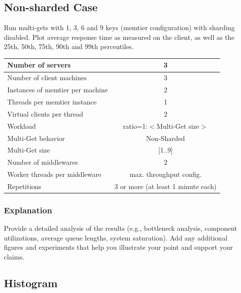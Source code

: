 \documentclass[11pt,a4paper]{article}
\begin{document}
\subsection{Non-sharded Case}

Run multi-gets with 1, 3, 6 and 9 keys (memtier configuration) with sharding disabled. Plot average response time as measured on the client, as well as the 25th, 50th, 75th, 90th and 99th percentiles.

\begin{center}
	\scriptsize{
		\begin{tabular}{|l|c|}
			\hline Number of servers                & 3                       \\ 
			\hline Number of client machines        & 3                       \\ 
			\hline Instances of memtier per machine & 2                       \\ 
			\hline Threads per memtier instance     & 1                       \\
			\hline Virtual clients per thread       & 2                		 \\ 
			\hline Workload                         & ratio=1:$<$Multi-Get size$>$              \\
			\hline Multi-Get behavior               & Non-Sharded             \\
			\hline Multi-Get size                   & [1..9]                  \\
			\hline Number of middlewares            & 2                       \\
			\hline Worker threads per middleware    & max. throughput config. \\
			\hline Repetitions                      & 3 or more (at least 1 minute each)               \\ 
			\hline 
		\end{tabular}
	} 
\end{center}

\subsubsection{Explanation}

Provide a detailed analysis of the results (e.g., bottleneck analysis, component utilizations, average queue lengths, system saturation). Add any additional figures and experiments that help you illustrate your point and support your claims.

\subsection{Histogram}
\end{document}
